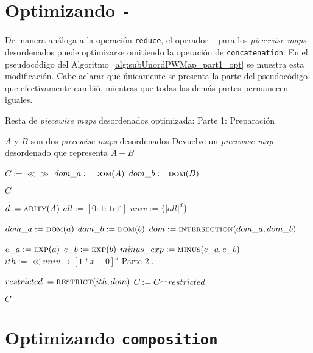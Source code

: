 \section{Optimizando \texttt{-}}

De manera análoga a la operación \texttt{reduce}, el operador \texttt{-} para los \textit{piecewise maps} desordenados puede optimizarse omitiendo la operación de \texttt{concatenation}. En el pseudocódigo del Algoritmo~\ref{alg:subUnordPWMap_part1_opt} se muestra esta modificación. Cabe aclarar que únicamente se presenta la parte del pseudocódigo que efectivamente cambió, mientras que todas las demás partes permanecen iguales.


\begin{algorithm}
	\caption{Resta de \textit{piecewise maps} desordenados optimizada: Parte 1: Preparación}
	\label{alg:subUnordPWMap_part1_opt}
	\begin{algorithmic}[1]
		\Require $A$ y $B$ son dos \textit{piecewise maps}  desordenados
		\Ensure Devuelve un \textit{piecewise map} desordenado que representa $A - B$ 
		
		\State $C := \ll\gg$ 
		\State $dom\_a := \Call{dom}{A}$
		\State $dom\_b := \Call{dom}{B}$ 
		
		\State \Return $C$
		\EndIf
		
		\State $d := \Call{arity}{A}$
		\State $all := [0:1:\texttt{Inf}]$
		\State $univ := \{|all|^d\}$
		
		\State $dom\_a := \Call{dom}{a}$
		\State $dom\_b := \Call{dom}{b}$
		\State $dom := \Call{intersection}{dom\_a, dom\_b}$
		
		\State $e\_a := \Call{exp}{a}$
		\State $e\_b := \Call{exp}{b}$
		\State $minus\_exp := \Call{minus}{e\_a, e\_b}$
		\State $ith := \ll univ \mapsto [1*x+0]^d $
		\State Parte 2...
		
		\State $restricted := \Call{restrict}{ith, dom}$ 
		\State $C := C \frown restricted$
		\EndIf
		\EndFor
		\EndFor
		
		\State \Return $C$
		\EndFunction
	\end{algorithmic}
\end{algorithm}

\section{Optimizando \texttt{composition}}

